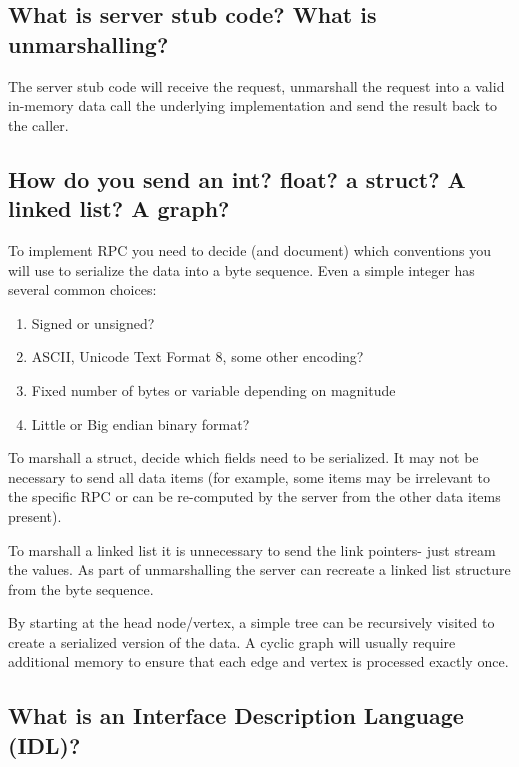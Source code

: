 \subsection{What is server stub code? What is unmarshalling?}\label{what-is-server-stub-code-what-is-unmarshalling}

The server stub code will receive the request, unmarshall the request into a valid in-memory data call the underlying implementation and send the result back to the caller.

\subsection{How do you send an int? float? a struct? A linked list? A graph?}\label{how-do-you-send-an-int-float-a-struct-a-linked-list-a-graph}

To implement RPC you need to decide (and document) which conventions you will use to serialize the data into a byte sequence. Even a simple integer has several common choices: 

\begin{enumerate}
\item Signed or unsigned? 
\item ASCII, Unicode Text Format 8, some other encoding?
\item Fixed number of bytes or variable depending on magnitude 
\item Little or Big endian binary format?
\end{enumerate}

To marshall a struct, decide which fields need to be serialized. It may not be necessary to send all data items (for example, some items may be irrelevant to the specific RPC or can be re-computed by the server from the other data items present).

To marshall a linked list it is unnecessary to send the link pointers- just stream the values. As part of unmarshalling the server can recreate a linked list structure from the byte sequence.

By starting at the head node/vertex, a simple tree can be recursively visited to create a serialized version of the data. A cyclic graph will usually require additional memory to ensure that each edge and vertex is processed exactly once.

\subsection{What is an Interface Description Language (IDL)?}

